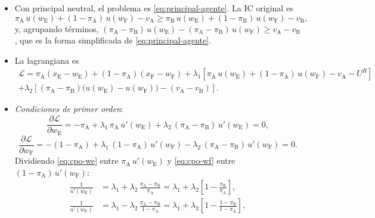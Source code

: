 \documentclass[11pt]{article}
\begin{document}
\begin{itemize}
\item Con principal neutral, el problema es \eqref{eq:principal-agente}. La IC original es
  \begin{equation}
  \pi_{\mathrm{A}}\,u(w_{\mathrm{E}})+(1-\pi_{\mathrm{A}})\,u(w_{\mathrm{F}})-v_{\mathrm{A}}\geq\pi_{\mathrm{B}}\,u(w_{\mathrm{E}})+(1-\pi_{\mathrm{B}})\,u(w_{\mathrm{F}})-v_{\mathrm{B}},
  \end{equation}
  y, agrupando términos, $(\pi_{\mathrm{A}}-\pi_{\mathrm{B}})\,u(w_{\mathrm{E}})-(\pi_{\mathrm{A}}-\pi_{\mathrm{B}})\,u(w_{\mathrm{F}})\geq v_{\mathrm{A}}-v_{\mathrm{B}}$, que es la forma simplificada de \eqref{eq:principal-agente}.
\item La lagrangiana es
  \begin{multline}
  \mathcal{L}=\pi_{\mathrm{A}}(x_{\mathrm{E}}-w_{\mathrm{E}})+(1-\pi_{\mathrm{A}})(x_{\mathrm{F}}-w_{\mathrm{F}})+\lambda_1\left[\pi_{\mathrm{A}}\,u(w_{\mathrm{E}})+(1-\pi_{\mathrm{A}})\,u(w_{\mathrm{F}})-v_{\mathrm{A}}-U^R\right]\\
  +\lambda_2\left[(\pi_{\mathrm{A}}-\pi_{\mathrm{B}})\bigl(u(w_{\mathrm{E}})-u(w_{\mathrm{F}})\bigr)-(v_{\mathrm{A}}-v_{\mathrm{B}})\right].
  \end{multline}
\item \emph{Condiciones de primer orden}:
  \begin{equation}
  \frac{\partial\mathcal{L}}{\partial w_{\mathrm{E}}}=-\pi_{\mathrm{A}}+\lambda_1\,\pi_{\mathrm{A}}\,u'(w_{\mathrm{E}})+\lambda_2\,(\pi_{\mathrm{A}}-\pi_{\mathrm{B}})\,u'(w_{\mathrm{E}})=0 , \label{eq:cpo-we}
  \end{equation}
  \begin{equation}
  \frac{\partial\mathcal{L}}{\partial w_{\mathrm{F}}}=-(1-\pi_{\mathrm{A}})+\lambda_1\,(1-\pi_{\mathrm{A}})\,u'(w_{\mathrm{F}})-\lambda_2\,(\pi_{\mathrm{A}}-\pi_{\mathrm{B}})\,u'(w_{\mathrm{F}})=0 . \label{eq:cpo-wf}
  \end{equation}
  Dividiendo \eqref{eq:cpo-we} entre $\pi_{\mathrm{A}}\,u'(w_{\mathrm{E}})$ y \eqref{eq:cpo-wf} entre $(1-\pi_{\mathrm{A}})\,u'(w_{\mathrm{F}})$:
  \begin{align}
  \frac{1}{u'(w_{\mathrm{E}})}&=\lambda_1+\lambda_2\,\frac{\pi_{\mathrm{A}}-\pi_{\mathrm{B}}}{\pi_{\mathrm{A}}}=\lambda_1+\lambda_2\left[1-\frac{\pi_{\mathrm{B}}}{\pi_{\mathrm{A}}}\right],\nonumber\\
  \frac{1}{u'(w_{\mathrm{F}})}&=\lambda_1-\lambda_2\,\frac{\pi_{\mathrm{A}}-\pi_{\mathrm{B}}}{1-\pi_{\mathrm{A}}}=\lambda_1+\lambda_2\left[1-\frac{1-\pi_{\mathrm{B}}}{1-\pi_{\mathrm{A}}}\right],\nonumber

\end{align}
\end{itemize}
\end{document}
